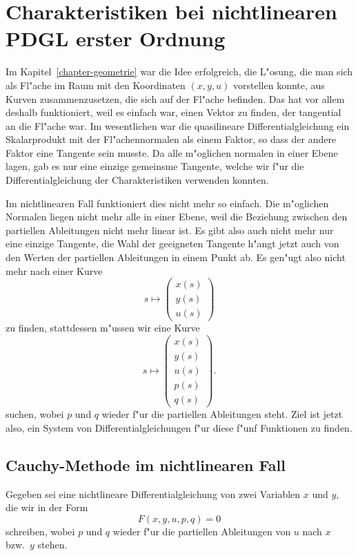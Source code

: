 \section{Charakteristiken bei nichtlinearen PDGL erster Ordnung}
Im Kapitel~\ref{chapter-geometrie} war die Idee erfolgreich, die L"osung,
die man sich als Fl"ache im Raum mit den Koordinaten $(x,y,u)$
vorstellen konnte, aus Kurven zusammenzusetzen, die sich auf der
Fl"ache befinden. Das hat vor allem deshalb funktioniert, weil es
einfach war, einen Vektor zu finden, der tangential an die Fl"ache
war. Im wesentlichen war die quasilineare Differentialgleichung ein
Skalarprodukt mit der Fl"achennormalen als einem Faktor, so dass
der andere Faktor eine Tangente sein musste. Da alle m"oglichen
normalen in einer Ebene lagen, gab es nur eine einzige gemeinsme
Tangente, welche wir f"ur die Differentialgleichung der
Charakteristiken verwenden konnten.

Im nichtlinearen Fall funktioniert dies nicht mehr so einfach.
Die m"oglichen Normalen liegen nicht mehr alle in einer Ebene,
weil die Beziehung zwischen den partiellen Ableitungen nicht
mehr linear ist. Es gibt also auch nicht mehr nur eine einzige
Tangente, die Wahl der geeigneten Tangente h"angt jetzt auch
von den Werten der partiellen Ableitungen in einem Punkt ab.
Es gen"ugt also nicht mehr nach einer Kurve
\[
s\mapsto
\begin{pmatrix}
x(s)\\
y(s)\\
u(s)
\end{pmatrix}
\]
zu finden, stattdessen m"ussen wir eine Kurve 
\[
s\mapsto
\begin{pmatrix}
x(s)\\
y(s)\\
u(s)\\
p(s)\\
q(s)
\end{pmatrix}.
\]
suchen, wobei $p$ und $q$ wieder f"ur die partiellen Ableitungen
steht. Ziel ist jetzt also, ein System von Differentialgleichungen
f"ur diese f"unf Funktionen zu finden.

\subsection{Cauchy-Methode im nichtlinearen Fall}
Gegeben sei eine nichtlineare Differentialgleichung von zwei
Variablen $x$ und $y$, die wir in der Form
\[
F(x,y,u,p,q)=0
\]
schreiben, wobei $p$ und $q$ wieder f"ur die partiellen Ableitungen
von $u$ nach $x$ bzw.~$y$ stehen.

